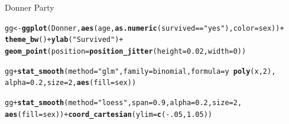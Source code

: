 \documentclass[11pt]{book}\usepackage[]{graphicx}\usepackage[]{color}
\makeatletter
\newcommand{\hlnum}[1]{\textcolor[rgb]{0.686,0.059,0.569}{#1}}%
\newcommand{\hlstr}[1]{\textcolor[rgb]{0.192,0.494,0.8}{#1}}%
\newcommand{\hlopt}[1]{\textcolor[rgb]{0,0,0}{#1}}%
\newcommand{\hlstd}[1]{\textcolor[rgb]{0.345,0.345,0.345}{#1}}%
\newcommand{\hlkwb}[1]{\textcolor[rgb]{0.69,0.353,0.396}{#1}}%
\newcommand{\hlkwc}[1]{\textcolor[rgb]{0.333,0.667,0.333}{#1}}%
\newcommand{\hlkwd}[1]{\textcolor[rgb]{0.737,0.353,0.396}{\textbf{#1}}}%
\newenvironment{kframe}{%
 \def\at@end@of@kframe{}%
 \ifinner\ifhmode%
  \def\at@end@of@kframe{\end{minipage}}%
  \begin{minipage}{\columnwidth}%
 \fi\fi%
 \def\FrameCommand##1{\hskip\@totalleftmargin \hskip-\fboxsep
 \colorbox{shadecolor}{##1}\hskip-\fboxsep
     \hskip-\linewidth \hskip-\@totalleftmargin \hskip\columnwidth}%
 \MakeFramed {\advance\hsize-\width
   \@totalleftmargin\z@ \linewidth\hsize
   \@setminipage}}%
 {\par\unskip\endMakeFramed%
 \at@end@of@kframe}
\newenvironment{knitrout}{}{} %
\renewenvironment{knitrout}{\small\renewcommand{\baselinestretch}{.85}}{} %
\makeatother
\begin{document}
\begin{Example}[donner1]{Donner Party}
% 
\begin{knitrout}
\color{fgcolor}\begin{kframe}
\begin{alltt}
\hlstd{gg} \hlkwb{<-} \hlkwd{ggplot}\hlstd{(Donner,} \hlkwd{aes}\hlstd{(age,} \hlkwd{as.numeric}\hlstd{(survived}\hlopt{==}\hlstr{"yes"}\hlstd{),} \hlkwc{color} \hlstd{= sex))} \hlopt{+}
  \hlkwd{theme_bw}\hlstd{()} \hlopt{+} \hlkwd{ylab}\hlstd{(}\hlstr{"Survived"}\hlstd{)} \hlopt{+}
  \hlkwd{geom_point}\hlstd{(}\hlkwc{position} \hlstd{=} \hlkwd{position_jitter}\hlstd{(}\hlkwc{height} \hlstd{=} \hlnum{0.02}\hlstd{,} \hlkwc{width} \hlstd{=} \hlnum{0}\hlstd{))}

\hlstd{gg} \hlopt{+} \hlkwd{stat_smooth}\hlstd{(}\hlkwc{method} \hlstd{=} \hlstr{"glm"}\hlstd{,} \hlkwc{family} \hlstd{= binomial,} \hlkwc{formula} \hlstd{= y} \hlopt{~} \hlkwd{poly}\hlstd{(x,}\hlnum{2}\hlstd{),}
                 \hlkwc{alpha} \hlstd{=} \hlnum{0.2}\hlstd{,} \hlkwc{size}\hlstd{=}\hlnum{2}\hlstd{,} \hlkwd{aes}\hlstd{(}\hlkwc{fill} \hlstd{= sex))}

\hlstd{gg} \hlopt{+} \hlkwd{stat_smooth}\hlstd{(}\hlkwc{method} \hlstd{=} \hlstr{"loess"}\hlstd{,} \hlkwc{span}\hlstd{=}\hlnum{0.9}\hlstd{,} \hlkwc{alpha} \hlstd{=} \hlnum{0.2}\hlstd{,} \hlkwc{size}\hlstd{=}\hlnum{2}\hlstd{,}
                 \hlkwd{aes}\hlstd{(}\hlkwc{fill} \hlstd{= sex))} \hlopt{+} \hlkwd{coord_cartesian}\hlstd{(}\hlkwc{ylim}\hlstd{=}\hlkwd{c}\hlstd{(}\hlopt{-}\hlnum{.05}\hlstd{,}\hlnum{1.05}\hlstd{))}
\end{alltt}
\end{kframe}\begin{figure}[!htbp]



\end{figure}
\end{knitrout}
\end{Example}
\end{document}
